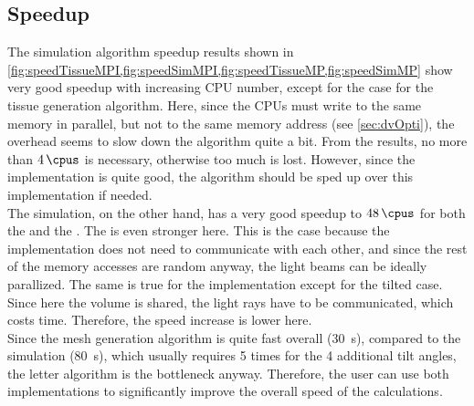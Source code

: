 \subsection{Speedup}
%
The simulation algorithm speedup results shown in \cref{fig:speedTissueMPI,fig:speedSimMPI,fig:speedTissueMP,fig:speedSimMP} show very good speedup with increasing \ac{CPU} number, except for the \openmp{} case for the tissue generation algorithm.
Here, since the \acsp{CPU} must write to the same memory in parallel, but not to the same memory address (see \cref{sec:dvOpti}), the overhead seems to slow down the algorithm quite a bit.
From the results, no more than $\SI{4}{\cpus}$ is necessary, otherwise too much \dummy{} is lost.
However, since the \mpi{} implementation is quite good, the algorithm should be sped up over this implementation if needed.
\\
%
The simulation, on the other hand, has a very good speedup to $\SI{48}{\cpus}$ for both the \mpi{} and the \openmp{}.
The \openmp{} is even stronger here.
This is the case because the \openmp{} implementation does not need to communicate with each other, and since the rest of the memory accesses are random anyway, the light beams can be ideally parallized.
The same is true for the \mpi{} implementation except for the tilted case.
Since here the volume is shared, the light rays have to be communicated, which costs time.
Therefore, the speed increase is lower here.
\\
%
Since the mesh generation algorithm is quite fast overall (\SI{30}{\second}), compared to the simulation (\SI{80}{\second}), which usually requires 5 times for the 4 additional tilt angles, the letter algorithm is the bottleneck anyway.
Therefore, the user can use both implementations to significantly improve the overall speed of the calculations.
%
%
%
